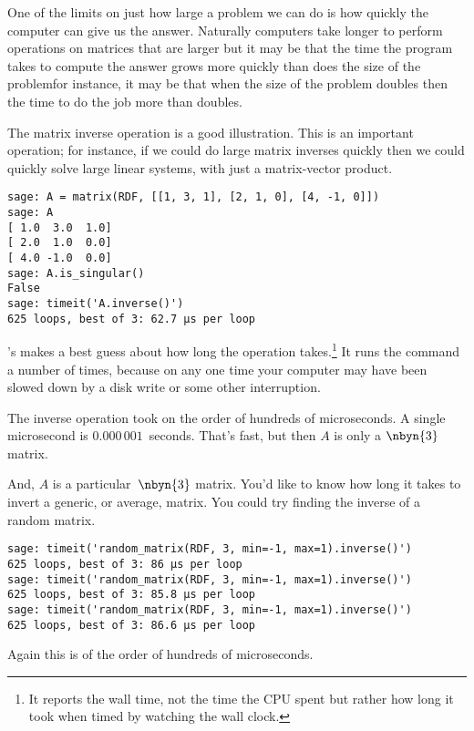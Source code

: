 One of the limits on just how large a problem we can do is how quickly 
the computer can give us the answer.
Naturally computers take longer to perform operations 
on matrices that are larger
but it may be that the time the program takes to compute the answer
grows more quickly than does the size of the problem\Dash for instance, 
it may be that when the size of the problem doubles then the time to 
do the job more than doubles.

The matrix inverse operation is a good illustration.
This is an important operation; for instance, if we could do large matrix 
inverses
quickly then we could quickly solve large linear systems, 
with just a matrix-vector product.
\begin{lstlisting}
sage: A = matrix(RDF, [[1, 3, 1], [2, 1, 0], [4, -1, 0]])
sage: A
[ 1.0  3.0  1.0]
[ 2.0  1.0  0.0]
[ 4.0 -1.0  0.0]
sage: A.is_singular()
False
sage: timeit('A.inverse()')
625 loops, best of 3: 62.7 μs per loop
\end{lstlisting}
\noindent
\Sage's  makes a best guess about how long
the operation takes.\footnote{%
  It reports the wall time, not the time the CPU
  spent but rather how long it took when timed
  by watching the wall clock.}
It runs the command 
a number of times, because on any one time your
computer may have been slowed down by a 
disk write or some other interruption.

The inverse operation took on the order of hundreds of microseconds.
A single microsecond is 
$0.000\,001$~seconds.
That's fast, but then $A$ is only a $\nbyn{3}$ matrix.

And, $A$ is a particular~$\nbyn{3}$ matrix. 
You'd like to know
how long it takes to invert a generic, or average, matrix.
You could try finding the inverse of a random matrix.
\begin{lstlisting}
sage: timeit('random_matrix(RDF, 3, min=-1, max=1).inverse()')
625 loops, best of 3: 86 μs per loop
sage: timeit('random_matrix(RDF, 3, min=-1, max=1).inverse()')
625 loops, best of 3: 85.8 μs per loop
sage: timeit('random_matrix(RDF, 3, min=-1, max=1).inverse()')
625 loops, best of 3: 86.6 μs per loop
\end{lstlisting}
\noindent
Again this is of the order of hundreds of microseconds.

